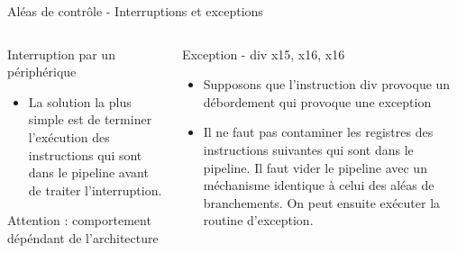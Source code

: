 %
\begin{Frame}{Aléas de contrôle - Interruptions et exceptions}

  \begin{columns}[t]
    \begin{column}{\BW} %
      \begin{block}{Interruption par un périphérique}
        \begin{center}
          \begin{itemize}
          \item La solution la plus simple est de terminer l'exécution des
            instructions qui sont dans le pipeline avant de traiter
            l'interruption.
          \end{itemize}
        \end{center}
      \end{block}
      \begin{block}{Attention : comportement dépéndant de l'architecture}
      \end{block}
    \end{column}
    \begin{column}{\BW} %
      \begin{block}{Exception - div x15, x16, x16}
        \begin{center}
          \begin{itemize}
          \item Supposons que l'instruction div provoque un débordement
            qui provoque une exception
          \item Il ne faut pas contaminer les registres des instructions
            suivantes qui sont dans le pipeline. Il faut vider le pipeline
            avec un méchanisme identique à celui des aléas de
            branchements. On peut ensuite exécuter la routine d'exception.
          \end{itemize}
        \end{center}
      \end{block}   
    \end{column}  
  \end{columns}  
\end{Frame}


